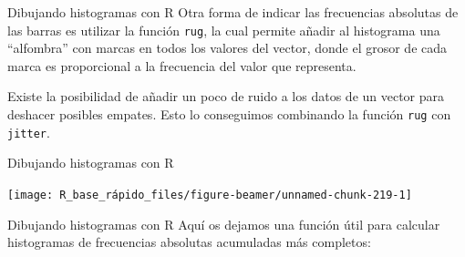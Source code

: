 \documentclass[
  ignorenonframetext,
  aspectratio=169]{beamer}
\newenvironment{Shaded}{\begin{snugshade}}{\end{snugshade}}
\newcommand{\AttributeTok}[1]{\textcolor[rgb]{0.13,0.29,0.53}{#1}}
\newcommand{\ConstantTok}[1]{\textcolor[rgb]{0.56,0.35,0.01}{#1}}
\newcommand{\ControlFlowTok}[1]{\textcolor[rgb]{0.13,0.29,0.53}{\textbf{#1}}}
\newcommand{\DecValTok}[1]{\textcolor[rgb]{0.00,0.00,0.81}{#1}}
\newcommand{\FunctionTok}[1]{\textcolor[rgb]{0.13,0.29,0.53}{\textbf{#1}}}
\newcommand{\NormalTok}[1]{#1}
\newcommand{\OtherTok}[1]{\textcolor[rgb]{0.56,0.35,0.01}{#1}}
\newcommand{\SpecialCharTok}[1]{\textcolor[rgb]{0.81,0.36,0.00}{\textbf{#1}}}
\newcommand{\StringTok}[1]{\textcolor[rgb]{0.31,0.60,0.02}{#1}}
\begin{document}
\begin{frame}[fragile]{Dibujando histogramas con R}
\label{dibujando-histogramas-con-r-5}
Otra forma de indicar las frecuencias absolutas de las barras es
utilizar la función \texttt{rug}, la cual permite añadir al histograma
una ``alfombra'' con marcas en todos los valores del vector, donde el
grosor de cada marca es proporcional a la frecuencia del valor que
representa.

Existe la posibilidad de añadir un poco de ruido a los datos de un
vector para deshacer posibles empates. Esto lo conseguimos combinando la
función \texttt{rug} con \texttt{jitter}.
\end{frame}

\begin{frame}{Dibujando histogramas con R}
\label{dibujando-histogramas-con-r-6}
\begin{center}\texttt{[image: R\_base\_rápido\_files/figure-beamer/unnamed-chunk-219-1]} \end{center}
\end{frame}

\begin{frame}[fragile]{Dibujando histogramas con R}
\label{dibujando-histogramas-con-r-7}
Aquí os dejamos una función útil para calcular histogramas de
frecuencias absolutas acumuladas más completos:

\begin{Shaded}
\end{Shaded}
\end{frame}
\end{document}
